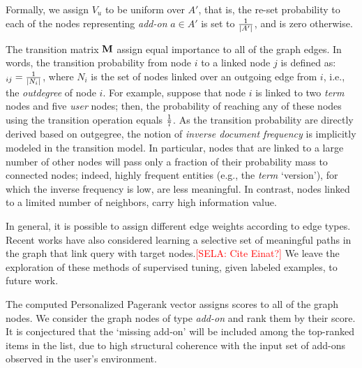 \documentclass[11pt,oneside]{book}
\newcommand{\transition}{{\bf M}}
\begin{document}
Formally, we assign $V_u$ to be uniform over $A'$, that is, the re-set
probability to each of the nodes representing {\it add-on} $a\in A'$
is set to ${1 \over \mid A' \mid}$, and is zero otherwise.

The transition matrix $\transition$ assign equal importance to all of
the graph edges. In words, the transition probability from node $i$ to
a linked node $j$ is defined as: $_{ij}={1 \over \mid N_i \mid}$,
where $N_i$ is the set of nodes linked over an outgoing edge from $i$,
i.e., the {\it outdegree} of node $i$. For example, suppose that node
$i$ is linked to two {\it term} nodes and five {\it user} nodes; then,
the probability of reaching any of these nodes using the transition
operation equals ${1\over 7}$. As the transition probability are
  directly derived based on outgegree, the notion of {\it inverse
    document frequency} is implicitly modeled in the transition
  model. In particular, nodes that are linked to a large number of
  other nodes will pass only a fraction of their probability mass to
  connected nodes; indeed, highly frequent entities (e.g., the {\it
    term} `version'), for which the inverse frequency is low, are less
  meaningful. In contrast, nodes linked to a limited number of
  neighbors, carry high information value. 

In general, it is possible to assign different edge weights according
to edge types. Recent works have also considered learning a selective
set of meaningful paths in the graph that link query with target
nodes.\textcolor{red}{[SELA: Cite Einat?]} We leave the exploration of these methods of supervised tuning,
given labeled examples, to future work. 

The computed Personalized Pagerank vector assigns scores to all of the
graph nodes. We consider the graph nodes of type {\it add-on} and rank
them by their score. It is conjectured that the `missing add-on' will
be included among the top-ranked items in the list, due to high
structural coherence with the input set of add-ons observed in the
user's environment.
\end{document}
